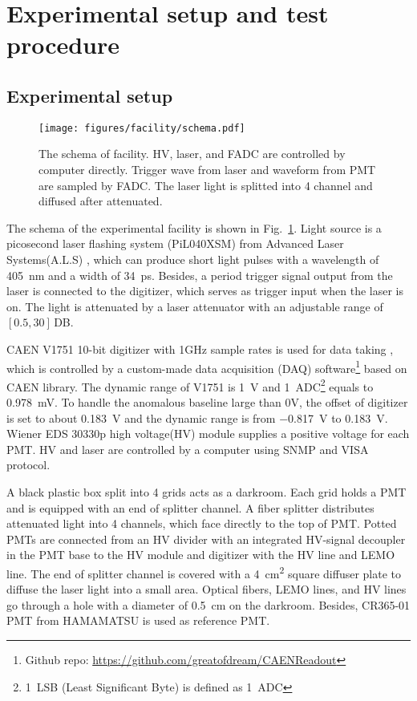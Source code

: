 \section{Experimental setup and test procedure}
\label{SetUp}
\subsection{Experimental setup}
\label{sec:setup}
\begin{figure}[!htbp]
    \centering
    \texttt{[image: figures/facility/schema.pdf]}
    \caption{The schema of facility. HV, laser, and FADC are controlled by computer directly. Trigger wave from laser and waveform from PMT are sampled by FADC. The laser light is splitted into 4 channel and diffused after attenuated.}
    \label{fig:facility}
\end{figure}

The schema of the experimental facility is shown in Fig.~\ref{fig:facility}. Light source is a picosecond laser flashing system (PiL040XSM) from Advanced Laser Systems(A.L.S) \cite{NTKLaser}, which can produce short light pulses with a wavelength of \SI{405}{nm} and a width of \SI{34}{ps}. Besides, a period trigger signal output from the laser is connected to the digitizer, which serves as trigger input when the laser is on. The light is attenuated by a laser attenuator with an adjustable range of $[0.5,30]$\,DB.

CAEN V1751 10-bit digitizer with 1GHz sample rates is used for data taking \cite{CAENV1751}, which is controlled by a custom-made data acquisition (DAQ) software\footnote{Github repo: \url{https://github.com/greatofdream/CAENReadout}} based on CAEN library. The dynamic range of V1751 is \SI{1}{V} and \SI{1}{ADC}\footnote{\SI{1}{LSB} (Least Significant Byte) is defined as \SI{1}{ADC}} equals to \SI{0.978}{mV}. To handle the anomalous baseline large than 0V, the offset of digitizer is set to about \SI{0.183}{V} and the dynamic range is from \SI{-0.817}{V} to \SI{0.183}{V}. Wiener EDS 30330p high voltage(HV) module \cite{WIENERHV} supplies a positive voltage for each PMT. HV and laser are controlled by a computer using SNMP\cite{SNMP} and VISA\cite{VISA} protocol.

A black plastic box split into 4 grids acts as a darkroom. Each grid holds a PMT and is equipped with an end of splitter channel. A fiber splitter %
distributes attenuated light into 4 channels, which face directly to the top of PMT. Potted PMTs are connected from an HV divider with an integrated HV-signal decoupler in the PMT base to the HV module and digitizer with the HV line and LEMO line. The end of splitter channel is covered with a \SI{4}{cm\tothe{2}} square diffuser plate to diffuse the laser light into a small area. Optical fibers, LEMO lines, and HV lines go through a hole with a diameter of \SI{0.5}{cm} on the darkroom. Besides, CR365-01 \cite{BJBS} PMT from HAMAMATSU is used as reference PMT.

